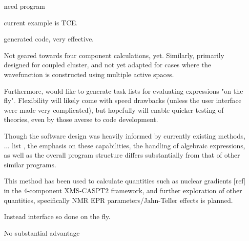 \documentclass[12pt]{article}
\begin{document}
need program

current example is TCE.

generated code, very effective.

Not geared towards four component calculations, yet. Similarly, primarily designed for coupled cluster, 
and not yet adapted for cases where the wavefunction is constructed using multiple active spaces.

Furthermore, would like to generate task lists for evaluating expressions "on the fly". Flexibility will
likely come with speed drawbacks (unless the user interface were made very complicated), but hopefully 
will enable quicker testing of theories, even by those averse to code development.

Though the software design was heavily informed by currently existing methods, ... list , 
the emphasis on these capabilities, the handling of algebraic expressions, as well as the overall
program structure differs substantially from that of other similar programs. 

This method has been used to calculate quantities such as nuclear gradients [ref] in the 4-component XMS-CASPT2 framework,
and further exploration of other quantities,  specifically NMR EPR parameters/Jahn-Teller effects is planned.






Instead interface so done on the fly.

No substantial advantage
\end{document}
